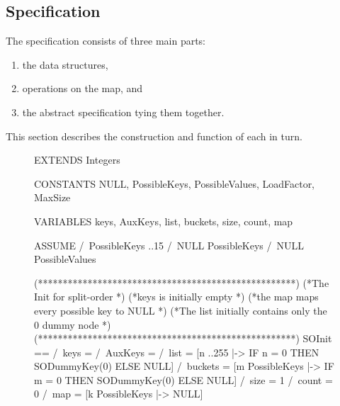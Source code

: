 \documentclass{uit-thesis}
\begin{document}
\subsection{Specification}
The specification consists of three main parts:
\begin{enumerate}
    \item \label{SpecList:structures} the data structures,
    \item \label{SpecList:operations} operations on the map, and
    \item \label{SpecList:spec} the abstract specification tying them together.
\end{enumerate}
This section describes the construction and function of each in turn.
\begin{figure}
    \begin{tla}
EXTENDS Integers

CONSTANTS NULL, PossibleKeys, PossibleValues, LoadFactor, MaxSize

VARIABLES keys, AuxKeys, list, buckets, size, count, map

ASSUME
    /\ PossibleKeys ..15
    /\ NULL \notin PossibleKeys
    /\ NULL \notin PossibleValues

(****************************************************)
(*The Init for split-order                          *)
(*keys is initially empty                           *)
(*the map maps every possible key to NULL           *)
(*The list initially contains only the 0 dummy node *)
(****************************************************)
SOInit ==   /\ keys = {}
            /\ AuxKeys = {}
            /\ list = [n ..255 |-> IF n = 0 THEN SODummyKey(0) ELSE NULL]
            /\ buckets = [m \in PossibleKeys |-> IF m = 0 THEN SODummyKey(0) ELSE NULL]
            /\ size = 1
            /\ count = 0
            /\ map = [k \in PossibleKeys |-> NULL]


\end{tla}
\end{figure}
\end{document}
